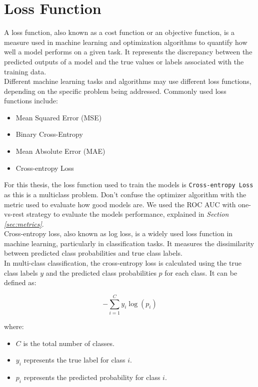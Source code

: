 \section{Loss Function}

A loss function, also known as a cost function or an objective function, is a measure used in machine learning and optimization algorithms to quantify how well a model performs on a given task. It represents the discrepancy between the predicted outputs of a model and the true values or labels associated with the training data. \\

Different machine learning tasks and algorithms may use different loss functions, depending on the specific problem being addressed. Commonly used loss functions include:

\begin{itemize}
    \item Mean Squared Error (MSE)
    \item Binary Cross-Entropy
    \item Mean Absolute Error (MAE)
    \item Cross-entropy Loss
\end{itemize}

For this thesis, the loss function used to train the models is
{\tt Cross-entropy Loss} as this is a multiclass problem. Don't confuse the optimizer
algorithm with the metric used to evaluate how good models are.
We used the ROC AUC with one-vs-rest strategy to evaluate the models performance, explained in \textit{Section \ref{sec:metrics}}. \\

Cross-entropy loss, also known as log loss, is a widely used loss function in machine learning, particularly in classification tasks. It measures the dissimilarity between predicted class probabilities and true class labels. \\

In multi-class classification, the cross-entropy loss is calculated using the true class labels \(y\) and the predicted class probabilities \(p\) for each class. It can be defined as:

\[-\sum_{i=1}^{C} y_i \log(p_i)\]

\noindent where:

\begin{itemize}
    \item \(C\) is the total number of classes.
    \item \(y_i\) represents the true label for class \(i\).
    \item \(p_i\) represents the predicted probability for class \(i\).
\end{itemize}

